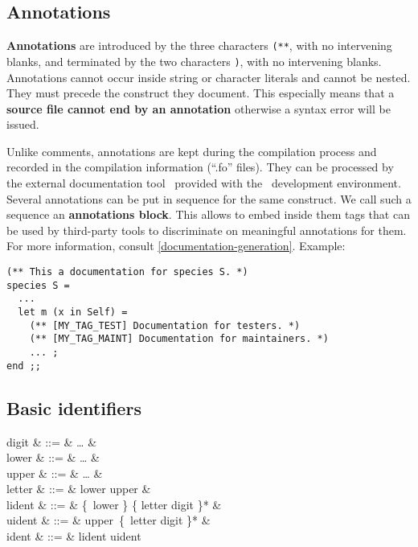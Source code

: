 \subsection{Annotations}
\label{annotation}
{\bf Annotations} are introduced by the three characters {\tt (**},
with no intervening blanks, and terminated by the two characters
{\tt *)}, with no intervening blanks.
Annotations cannot occur inside string or character literals and
cannot be nested. They must precede the construct  they document. This
especially means that a
{\bf source file cannot end by an annotation} otherwise a syntax
error will be issued.

Unlike comments, annotations are kept during the compilation process
and recorded in the compilation information (``.fo'' files). They can
be processed by the external documentation tool \focdoc\ provided with
the \focal\ development environment. Several annotations can be put
in sequence for the same construct. We call such a sequence an
{\bf annotations block}. This allows to embed
inside them tags that can be used by third-party tools to discriminate
on meaningful annotations for them. For more information, consult
\ref{documentation-generation}.
Example:
{\scriptsize
\begin{lstlisting}
(** This a documentation for species S. *)
species S =
  ...
  let m (x in Self) =
    (** [MY_TAG_TEST] Documentation for testers. *)
    (** [MY_TAG_MAINT] Documentation for maintainers. *)
    ... ;
end ;;
\end{lstlisting}
}



\subsection{Basic identifiers}
\vspace{0.2cm}
\begin{syntax}
digit & ::= &  \ldots {} & \\
lower & ::= &  \ldots {} & \\
upper & ::= &  \ldots {} & \\
letter & ::= & lower \mid upper & \\
lident & ::= & \{\ lower \mid \terminal{\_} \}
            \{ letter \mid digit \mid \terminal{\_} \}* & \\
uident & ::= & upper\ \{\ letter \mid digit \mid \terminal{\_} \}* & \\
ident & ::= & lident \mid uident
\end{syntax}
\vspace{0.2cm}

